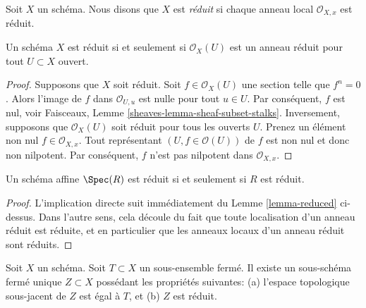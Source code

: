 \begin{definition}
\label{definition-reduced}
Soit  $X$  un schéma. Nous disons que  $X$  est
 {\it  réduit}  si chaque anneau local  $\mathcal{O}_{X, x}$ 
est réduit.
\end{definition}

\begin{lemma}
\label{lemma-reduced}
Un schéma  $X$  est réduit si et seulement si  $\mathcal{O}_X(U)$  est un anneau
réduit pour tout  $U \subset X$  ouvert.
\end{lemma}

\begin{proof}
Supposons que  $X$  soit réduit. Soit  $f \in \mathcal{O}_X(U)$  une section telle que
 $f^n = 0$. Alors l'image de  $f$  dans  $\mathcal{O}_{U, u}$  est nulle pour tout
 $u \in U$. Par conséquent,  $f$  est nul, voir Faisceaux, Lemme
 \ref{sheaves-lemma-sheaf-subset-stalks}. Inversement, supposons que  $\mathcal{O}_X(U)$  soit réduit pour tous les
ouverts  $U$. Prenez un élément non nul  $f \in \mathcal{O}_{X, x}$. Tout représentant
 $(U, f \in \mathcal{O}(U))$  de  $f$  est non nul et donc non nilpotent. Par conséquent,
 $f$  n'est pas nilpotent dans  $\mathcal{O}_{X, x}$.
\end{proof}

\begin{lemma}
\label{lemma-affine-reduced}
Un schéma affine  $\Spec(R)$  est réduit si et seulement si  $R$  est
réduit.
\end{lemma}

\begin{proof}
L'implication directe suit immédiatement du Lemme  \ref{lemma-reduced}  ci-dessus. Dans
l'autre sens, cela découle du fait que toute localisation d'un anneau réduit est
réduite, et en particulier que les anneaux locaux d'un anneau réduit sont réduits.
\end{proof}

\begin{lemma}
\label{lemma-reduced-closed-subscheme}
Soit  $X$  un schéma. Soit  $T \subset X$  un sous-ensemble fermé. Il existe
un sous-schéma fermé unique  $Z \subset X$  possédant les propriétés suivantes: (a)
l'espace topologique sous-jacent de  $Z$  est égal à  $T$, et (b)
 $Z$  est réduit.
\end{lemma}

